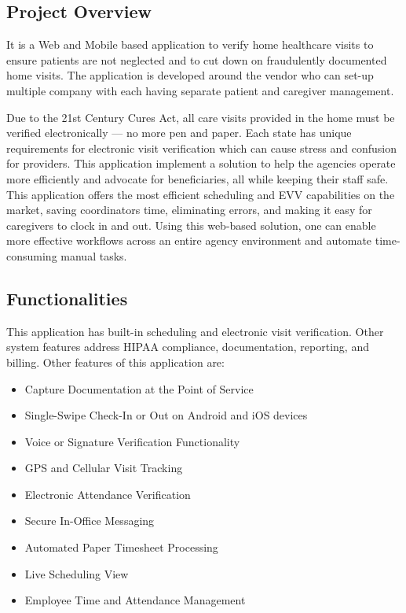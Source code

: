 \subsection{Project Overview}

It is a Web and Mobile based application to verify home healthcare visits to ensure patients are not neglected and to cut down on fraudulently documented home visits.
The application is developed around the vendor who can set-up multiple company with each having separate patient and caregiver management.

Due to the 21st Century Cures Act, all care visits provided in the home must be verified electronically — no more pen and paper.
Each state has unique requirements for electronic visit verification which can cause stress and confusion for providers.
This application implement a solution to help the agencies operate more efficiently and advocate for beneficiaries, all while keeping their staff safe. \\

This application offers the most efficient scheduling and EVV capabilities on the market, saving coordinators time, eliminating errors, and making it easy for caregivers to clock in and out.
Using this web-based solution, one can enable more effective workflows across an entire agency environment and automate time-consuming manual tasks.


\subsection{Functionalities}

This application has built-in scheduling and electronic visit verification.
Other system features address HIPAA compliance, documentation, reporting, and billing.
Other features of this application are:

\begin{itemize}
    \item Capture Documentation at the Point of Service 
    \item Single-Swipe Check-In or Out on Android and iOS devices
    \item Voice or Signature Verification Functionality
    \item GPS and Cellular Visit Tracking
    \item Electronic Attendance Verification
    \item Secure In-Office Messaging
    \item Automated Paper Timesheet Processing
    \item Live Scheduling View
    \item Employee Time and Attendance Management
\end{itemize}

